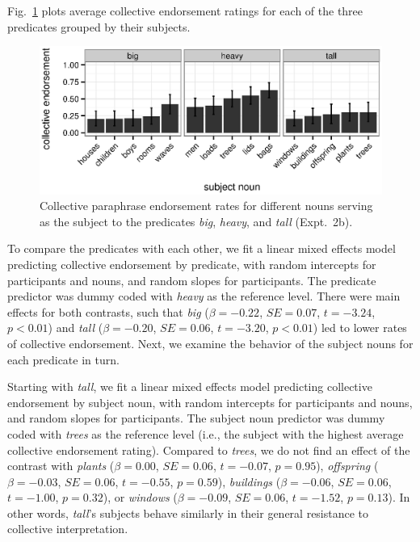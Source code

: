 \documentclass[linguex]{sp}
\begin{document}
Fig.~\ref{bhtcoll} plots average collective endorsement ratings for each of the three predicates grouped by their subjects.

\begin{figure}[h!]
	\centering
	\includegraphics[width=.85\linewidth]{plots/bht_plot2.eps}
	\vspace{0pt}
	\caption{Collective paraphrase endorsement rates for different nouns serving as the subject to the predicates \emph{big}, \emph{heavy}, and \emph{tall} (Expt.~2b).} \label{bhtcoll}
\end{figure}

To compare the predicates with each other, we fit a linear mixed effects model predicting collective endorsement by predicate, with random intercepts for participants and nouns, and random slopes for participants. The predicate predictor was dummy coded with \emph{heavy} as the reference level. There were main effects for both contrasts, such that \emph{big} ($\beta=-0.22$, $SE=0.07$, $t=-3.24$, $p<0.01$) and \emph{tall} ($\beta=-0.20$, $SE=0.06$, $t=-3.20$, $p<0.01$) led to lower rates of collective endorsement. Next, we examine the behavior of the subject nouns for each predicate in turn.

Starting with \emph{tall}, we fit a linear mixed effects model predicting collective endorsement by subject noun, with random intercepts for participants and nouns, and random slopes for participants. The subject noun predictor was dummy coded with \emph{trees} as the reference level (i.e., the subject with the highest average collective endorsement rating). Compared to \emph{trees}, we do not find an effect of the contrast with \emph{plants} ($\beta=0.00$, $SE=0.06$, $t=-0.07$, $p=0.95$), \emph{offspring} ($\beta=-0.03$, $SE=0.06$, $t=-0.55$, $p=0.59$), \emph{buildings} ($\beta=-0.06$, $SE=0.06$, $t=-1.00$, $p=0.32$), or \emph{windows} ($\beta=-0.09$, $SE=0.06$, $t=-1.52$, $p=0.13$). In other words, \emph{tall}'s subjects behave similarly in their general resistance to collective interpretation. 
\end{document}
